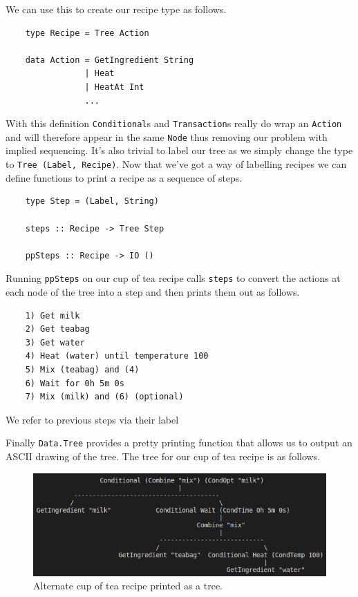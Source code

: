 \documentclass[11pt]{article}
\begin{document}
We can use this to create our recipe type as follows.

\begin{lstlisting}
    type Recipe = Tree Action

    data Action = GetIngredient String
                | Heat
                | HeatAt Int
                ...
\end{lstlisting}

With this definition \texttt{Conditional}s and \texttt{Transaction}s really do wrap an
\texttt{Action} and will therefore appear in the same \texttt{Node} thus removing our
problem with implied sequencing. It's also trivial to label our tree as we simply
change the type to \texttt{Tree (Label, Recipe)}. Now that we've got a way of
labelling recipes we can define functions to print a recipe as a sequence of steps.

\begin{lstlisting}
    type Step = (Label, String)

    steps :: Recipe -> Tree Step

    ppSteps :: Recipe -> IO ()
\end{lstlisting}

Running \texttt{ppSteps} on our cup of tea recipe calls \texttt{steps} to convert
the actions at each node of the tree into a step and then prints them out as follows.

\begin{lstlisting}
    1) Get milk
    2) Get teabag
    3) Get water
    4) Heat (water) until temperature 100
    5) Mix (teabag) and (4)
    6) Wait for 0h 5m 0s
    7) Mix (milk) and (6) (optional)
\end{lstlisting}

We refer to previous steps via their label

Finally \texttt{Data.Tree} provides a pretty printing function that allows us
to output an ASCII drawing of the tree. The tree for our cup of tea recipe is
as follows.

\begin{figure}[h]
\includegraphics[width=\textwidth, keepaspectratio]{cupOfTea.png}
\centering
\caption{Alternate cup of tea recipe printed as a tree.}
\end{figure}
\end{document}
